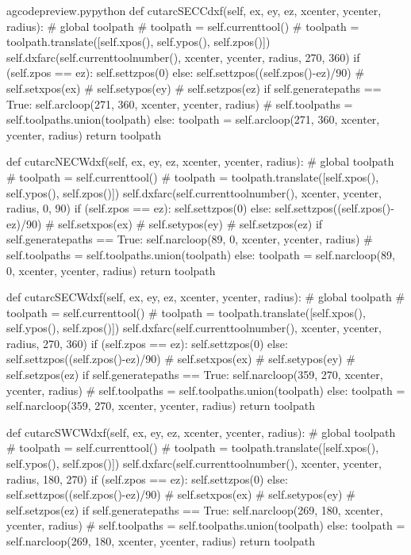 \documentclass{ltxdoc}
\begin{document}
\begin{writecode}{a}{gcodepreview.py}{python}
    def cutarcSECCdxf(self, ex, ey, ez, xcenter, ycenter, radius):
#        global toolpath
#        toolpath = self.currenttool()
#        toolpath = toolpath.translate([self.xpos(), self.ypos(), self.zpos()])
        self.dxfarc(self.currenttoolnumber(), xcenter, ycenter, radius, 270, 360)
        if (self.zpos == ez):
            self.settzpos(0)
        else:         
            self.settzpos((self.zpos()-ez)/90)
#        self.setxpos(ex)
#        self.setypos(ey)
#        self.setzpos(ez)
        if self.generatepaths == True:
            self.arcloop(271, 360, xcenter, ycenter, radius)
#            self.toolpaths = self.toolpaths.union(toolpath)
        else:
            toolpath = self.arcloop(271, 360, xcenter, ycenter, radius)
            return toolpath

    def cutarcNECWdxf(self, ex, ey, ez, xcenter, ycenter, radius):
#        global toolpath
#        toolpath = self.currenttool()
#        toolpath = toolpath.translate([self.xpos(), self.ypos(), self.zpos()])
        self.dxfarc(self.currenttoolnumber(), xcenter, ycenter, radius, 0, 90)
        if (self.zpos == ez):
            self.settzpos(0)
        else:         
            self.settzpos((self.zpos()-ez)/90)
#        self.setxpos(ex)
#        self.setypos(ey)
#        self.setzpos(ez)
        if self.generatepaths == True:
            self.narcloop(89, 0, xcenter, ycenter, radius)
#            self.toolpaths = self.toolpaths.union(toolpath)
        else:
            toolpath = self.narcloop(89, 0, xcenter, ycenter, radius)
            return toolpath

    def cutarcSECWdxf(self, ex, ey, ez, xcenter, ycenter, radius):
#        global toolpath
#        toolpath = self.currenttool()
#        toolpath = toolpath.translate([self.xpos(), self.ypos(), self.zpos()])
        self.dxfarc(self.currenttoolnumber(), xcenter, ycenter, radius, 270, 360)
        if (self.zpos == ez):
            self.settzpos(0)
        else:         
            self.settzpos((self.zpos()-ez)/90)
#        self.setxpos(ex)
#        self.setypos(ey)
#        self.setzpos(ez)
        if self.generatepaths == True:
            self.narcloop(359, 270, xcenter, ycenter, radius)
#            self.toolpaths = self.toolpaths.union(toolpath)
        else:
            toolpath = self.narcloop(359, 270, xcenter, ycenter, radius)
            return toolpath

    def cutarcSWCWdxf(self, ex, ey, ez, xcenter, ycenter, radius):
#        global toolpath
#        toolpath = self.currenttool()
#        toolpath = toolpath.translate([self.xpos(), self.ypos(), self.zpos()])
        self.dxfarc(self.currenttoolnumber(), xcenter, ycenter, radius, 180, 270)
        if (self.zpos == ez):
            self.settzpos(0)
        else:         
            self.settzpos((self.zpos()-ez)/90)
#        self.setxpos(ex)
#        self.setypos(ey)
#        self.setzpos(ez)
        if self.generatepaths == True:
            self.narcloop(269, 180, xcenter, ycenter, radius)
#            self.toolpaths = self.toolpaths.union(toolpath)
        else:
            toolpath = self.narcloop(269, 180, xcenter, ycenter, radius)
            return toolpath


\end{writecode}
\end{document}
